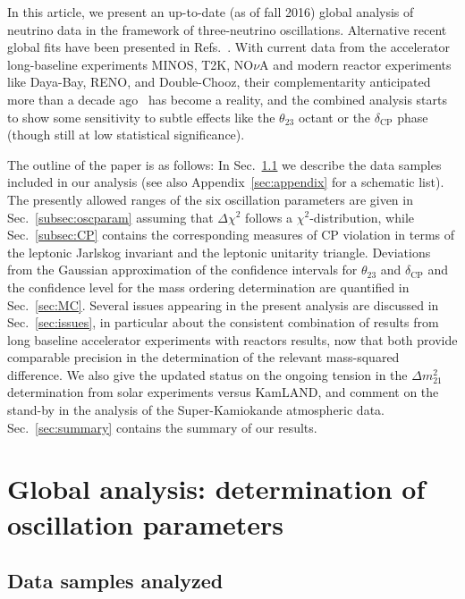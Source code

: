 \documentclass[a4paper, 11pt]{article}
\newcommand{\Dmq}{\Delta m^2}
\begin{document}
In this article, we present an up-to-date (as of fall 2016) global
analysis of neutrino data in the framework of three-neutrino
oscillations. Alternative recent global fits have been presented in
Refs.~\cite{Capozzi:2016rtj, Forero:2014bxa}. With current data from
the accelerator long-baseline experiments MINOS, T2K, NO$\nu$A and
modern reactor experiments like Daya-Bay, RENO, and Double-Chooz,
their complementarity anticipated more than a decade
ago~\cite{Minakata:2002jv, Huber:2003pm, Huber:2004ug} has become a
reality, and the combined analysis starts to show some sensitivity to
subtle effects like the $\theta_{23}$ octant or the $\delta_\text{CP}$
phase (though still at low statistical significance).

The outline of the paper is as follows: In Sec.~\ref{subsec:data} we
describe the data samples included in our analysis (see also
Appendix~\ref{sec:appendix} for a schematic list).  The presently
allowed ranges of the six oscillation parameters are given in
Sec.~\ref{subsec:oscparam} assuming that $\Delta\chi^2$ follows a
$\chi^2$-distribution, while Sec.~\ref{subsec:CP} contains the
corresponding measures of CP violation in terms of the leptonic
Jarlskog invariant and the leptonic unitarity triangle.  Deviations
from the Gaussian approximation of the confidence intervals for
$\theta_{23}$ and $\delta_\text{CP}$ and the confidence level for the
mass ordering determination are quantified in Sec.~\ref{sec:MC}.
Several issues appearing in the present analysis are discussed in
Sec.~\ref{sec:issues}, in particular about the consistent combination
of results from long baseline accelerator experiments with reactors
results, now that both provide comparable precision in the
determination of the relevant mass-squared difference. We also give
the updated status on the ongoing tension in the $\Dmq_{21}$
determination from solar experiments versus KamLAND, and comment on
the stand-by in the analysis of the Super-Kamiokande atmospheric
data. Sec.~\ref{sec:summary} contains the summary of our results.

\section{Global analysis: determination of oscillation parameters}
\label{sec:global}

\subsection{Data samples analyzed}
\label{subsec:data}
\end{document}
